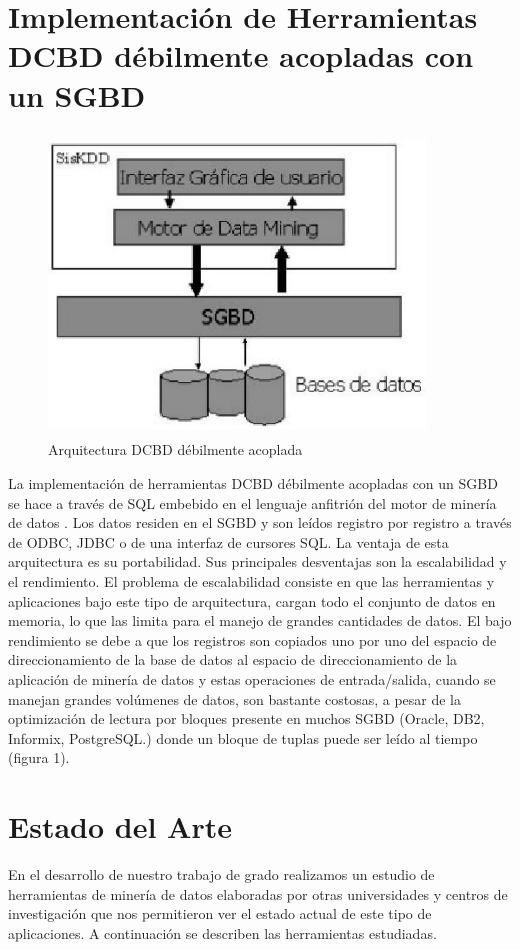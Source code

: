 \section{Implementaci\'on de  Herramientas DCBD d\'ebilmente acopladas con un SGBD}
\begin{figure}[h]
   \centering
   \includegraphics[width=10cm,height=8cm]{imgsMteorico/arquitectura.jpg}
   \caption{Arquitectura DCBD d\'ebilmente acoplada}
   \label{fig1}
\end{figure}

La implementaci\'on de herramientas DCBD d\'ebilmente acopladas con un SGBD se hace a
trav\'es de SQL embebido en
el lenguaje anfitri\'on del motor de miner\'ia de datos \cite{3}.  Los datos residen en
el SGBD y son le\'idos
registro por registro a trav\'es de ODBC, JDBC o de una interfaz  de cursores SQL. La
ventaja de esta arquitectura
es su portabilidad. Sus principales desventajas son la escalabilidad y el rendimiento. El
problema de
escalabilidad consiste en que las herramientas y aplicaciones bajo este tipo de
arquitectura,  cargan todo el
conjunto de datos en memoria, lo que las limita para el manejo de grandes cantidades de
datos. El bajo rendimiento
se debe a que los registros son copiados uno por uno  del espacio de direccionamiento de
la base de datos al
espacio de direccionamiento de la aplicaci\'on de miner\'ia de datos \cite{6,15}  y
estas  operaciones de
entrada/salida,  cuando se manejan grandes vol\'umenes de datos,  son bastante costosas,
a pesar de la
optimizaci\'on de lectura por bloques presente en muchos SGBD (Oracle, DB2, Informix,
PostgreSQL.) donde un bloque
de tuplas puede ser le\'ido al tiempo (figura 1).

\section{Estado del Arte}
En el desarrollo de nuestro trabajo de grado realizamos un estudio de herramientas de miner\'ia de datos
elaboradas por otras universidades y centros de investigaci\'on que nos permitieron ver el estado actual de este
tipo de aplicaciones. A continuaci\'on se describen las herramientas estudiadas.

